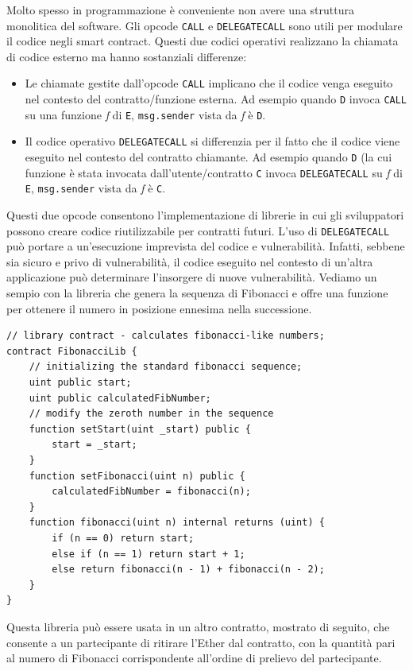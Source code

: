 Molto spesso in programmazione è conveniente non avere una struttura monolitica del software. Gli opcode \texttt{CALL} e \texttt{DELEGATECALL} sono utili per modulare il codice negli smart contract. Questi due codici operativi realizzano la chiamata di codice esterno ma hanno sostanziali differenze:
\begin{itemize}
    \item Le chiamate gestite dall'opcode \texttt{CALL} implicano che il codice venga eseguito nel contesto del contratto/funzione esterna. Ad esempio quando \texttt{D} invoca \texttt{CALL} su una funzione \textit{f} di \texttt{E}, \texttt{msg.sender} vista da \textit{f} è \texttt{D}.
    \item Il codice operativo \texttt{DELEGATECALL} si differenzia per il fatto che il codice viene eseguito nel contesto del contratto chiamante. Ad esempio quando \texttt{D} (la cui funzione è stata invocata dall'utente/contratto \texttt{C} invoca \texttt{DELEGATECALL} su \textit{f} di \texttt{E}, \texttt{msg.sender} vista da \textit{f} è \texttt{C}.
\end{itemize}
Questi due opcode consentono l'implementazione di librerie in cui gli sviluppatori possono creare codice riutilizzabile per contratti futuri. L'uso di \texttt{DELEGATECALL} può portare a un'esecuzione imprevista del codice e vulnerabilità. Infatti, sebbene sia sicuro e privo di vulnerabilità, il codice eseguito nel contesto di un'altra applicazione può determinare l'insorgere di nuove vulnerabilità. Vediamo un sempio con la libreria che genera la sequenza di Fibonacci e offre una funzione per ottenere il numero in posizione ennesima nella successione.


\begin{lstlisting}[language=Solidity]
// library contract - calculates fibonacci-like numbers;
contract FibonacciLib {
    // initializing the standard fibonacci sequence;
    uint public start;
    uint public calculatedFibNumber;
    // modify the zeroth number in the sequence
    function setStart(uint _start) public {
        start = _start;
    }
    function setFibonacci(uint n) public {
        calculatedFibNumber = fibonacci(n);
    }
    function fibonacci(uint n) internal returns (uint) {
        if (n == 0) return start;
        else if (n == 1) return start + 1;
        else return fibonacci(n - 1) + fibonacci(n - 2);
    }
}
\end{lstlisting}


Questa libreria può essere usata in un altro contratto, mostrato di seguito, che consente a un partecipante di ritirare l'Ether dal contratto, con la quantità pari al numero di Fibonacci corrispondente all'ordine di prelievo del partecipante.

